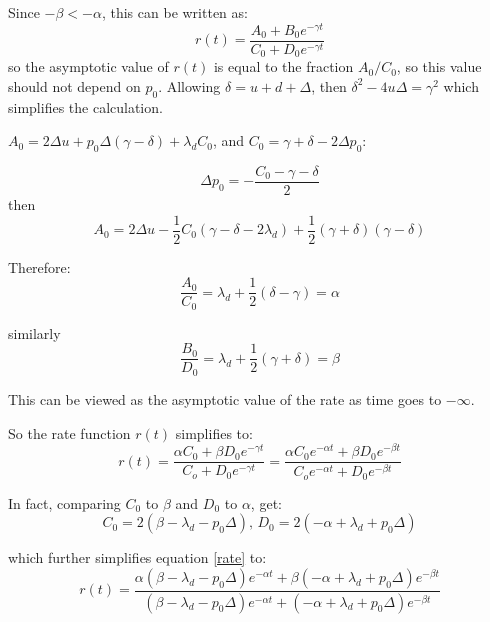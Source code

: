 Since $-\beta<-\alpha$, this can be written as:
\begin{equation}
r(t) = \frac{A_0+B_0e^{-\gamma t}}{C_0 + D_0e^{-\gamma t}}
\end{equation}
so the asymptotic value of $r(t)$ is equal to the fraction $A_0/C_0$, so this value should not depend on $p_0$.  Allowing $\delta=u+d+\Delta$, then $\delta^2 -4u\Delta= \gamma^2$ which simplifies the calculation.

$A_0 = 2\Delta u + p_0\Delta(\gamma-\delta) + \lambda_d C_0$, and $C_0 = \gamma + \delta -2\Delta p_0$:

\begin{equation}
\Delta p_0 = -\frac{C_0 - \gamma - \delta}{2}
\end{equation}
then
\begin{equation}
A_0 = 2\Delta u - \frac{1}{2}C_0(\gamma-\delta - 2\lambda_d) +\frac{1}{2}(\gamma+\delta)(\gamma-\delta)
\end{equation}

Therefore:
\begin{equation}
\frac{A_0}{C_0} = \lambda_d + \frac{1}{2}(\delta-\gamma) = \alpha
\end{equation}

similarly
\begin{equation}
\frac{B_0}{D_0} = \lambda_d + \frac{1}{2}(\gamma+\delta) = \beta
\end{equation}

This can be viewed as the asymptotic value of the rate as time goes to $-\infty$.

So the rate function $r(t)$ simplifies to:
\begin{equation}\label{rate}
r(t) = \frac{\alpha C_0 + \beta D_0e^{-\gamma t}}{C_o + D_0e^{-\gamma t}} = \frac{\alpha C_0e^{-\alpha t} + \beta D_0e^{-\beta t}}{C_oe^{-\alpha t} + D_0e^{-\beta t}} 
\end{equation}

In fact, comparing $C_0$ to $\beta$ and $D_0$ to $\alpha$, get:
\begin{equation}
C_0 = 2(\beta - \lambda_d - p_0\Delta), \, D_0 = 2(-\alpha + \lambda_d + p_0\Delta)
\end{equation}

which further simplifies equation \ref{rate} to:
\begin{equation}
r(t) = \frac{\alpha(\beta - \lambda_d - p_0\Delta)e^{-\alpha t} + \beta(-\alpha + \lambda_d + p_0\Delta)e^{-\beta t}}{(\beta - \lambda_d - p_0\Delta)e^{-\alpha t} + (-\alpha + \lambda_d + p_0\Delta)e^{-\beta t}}
\end{equation}

